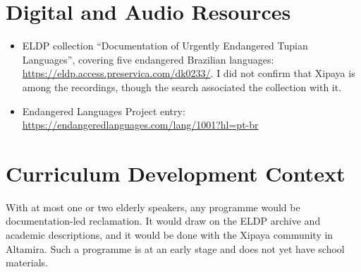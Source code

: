 \documentclass[12pt]{article}
\begin{document}
\section{Digital and Audio Resources}
\begin{itemize}
\item ELDP collection ``Documentation of Urgently Endangered Tupian Languages'', covering five endangered Brazilian languages: \url{https://eldp.access.preservica.com/dk0233/}. I did not confirm that Xipaya is among the recordings, though the search associated the collection with it.
\item Endangered Languages Project entry: \url{https://endangeredlanguages.com/lang/1001?hl=pt-br}
\end{itemize}

\section{Curriculum Development Context}
With at most one or two elderly speakers, any programme would be documentation-led reclamation. It would draw on the ELDP archive and academic descriptions, and it would be done with the Xipaya community in Altamira. Such a programme is at an early stage and does not yet have school materials.
\end{document}
